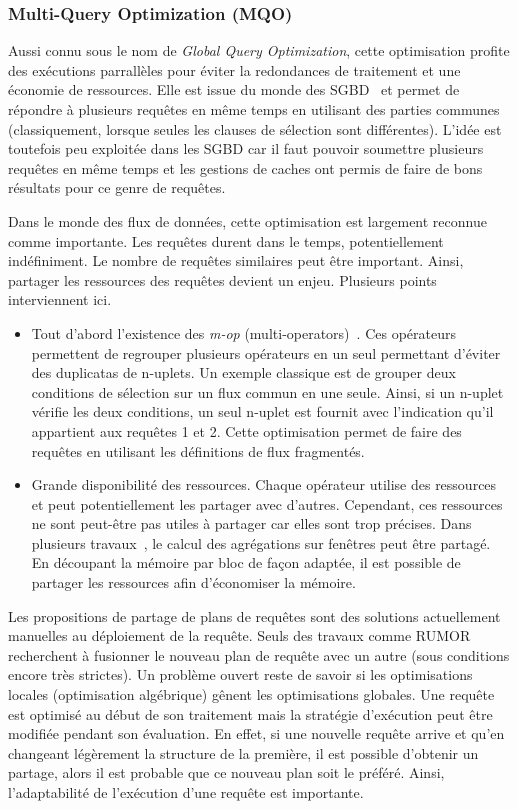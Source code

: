 \subsubsection{Multi-Query Optimization (MQO)}
Aussi connu sous le nom de \textit{Global Query Optimization}, cette optimisation profite des exécutions parrallèles pour éviter la redondances de traitement et une économie de ressources. Elle est issue du monde des SGBD~\cite{Sellis:mqo} et permet de répondre à plusieurs requêtes en même temps en utilisant des parties communes (classiquement, lorsque seules les clauses de sélection sont différentes). L'idée est toutefois peu exploitée dans les SGBD car il faut pouvoir soumettre plusieurs requêtes en même temps et les gestions de caches ont permis de faire de bons résultats pour ce genre de requêtes.

Dans le monde des flux de données, cette optimisation est largement reconnue comme importante. Les requêtes durent dans le temps, potentiellement indéfiniment. Le nombre de requêtes similaires peut être important. Ainsi, partager les ressources des requêtes devient un enjeu. Plusieurs points interviennent ici.
\begin{itemize}
 \item Tout d'abord l'existence des \textit{m-op} (multi-operators)~\cite{Hong:mqo}. Ces opérateurs permettent de regrouper plusieurs opérateurs en un seul permettant d'éviter des duplicatas de n-uplets. Un exemple classique est de grouper deux conditions de sélection sur un flux commun en une seule. Ainsi, si un n-uplet vérifie les deux conditions, un seul n-uplet est fournit avec l'indication qu'il appartient aux requêtes 1 et 2. Cette optimisation permet de faire des requêtes en utilisant les définitions de flux fragmentés.
 \item Grande disponibilité des ressources. Chaque opérateur utilise des ressources et peut potentiellement les partager avec d'autres. Cependant, ces ressources ne sont peut-être pas utiles à partager car elles sont trop précises. Dans plusieurs travaux~\cite{Arasu:resource}, le calcul des agrégations sur fenêtres peut être partagé. En découpant la mémoire par bloc de façon adaptée, il est possible de partager les ressources afin d'économiser la mémoire.
\end{itemize}

Les propositions de partage de plans de requêtes sont des solutions actuellement manuelles au déploiement de la requête. Seuls des travaux comme RUMOR~\cite{Hong:mqo} recherchent à fusionner le nouveau plan de requête avec un autre (sous conditions encore très strictes). Un problème ouvert reste de savoir si les optimisations locales (optimisation algébrique) gênent les optimisations globales. Une requête est optimisé au début de son traitement mais la stratégie d'exécution peut être modifiée pendant son évaluation. En effet, si une nouvelle requête arrive et qu'en changeant légèrement la structure de la première, il est possible d'obtenir un partage, alors il est probable que ce nouveau plan soit le préféré. Ainsi, l'adaptabilité de l'exécution d'une requête est importante.

